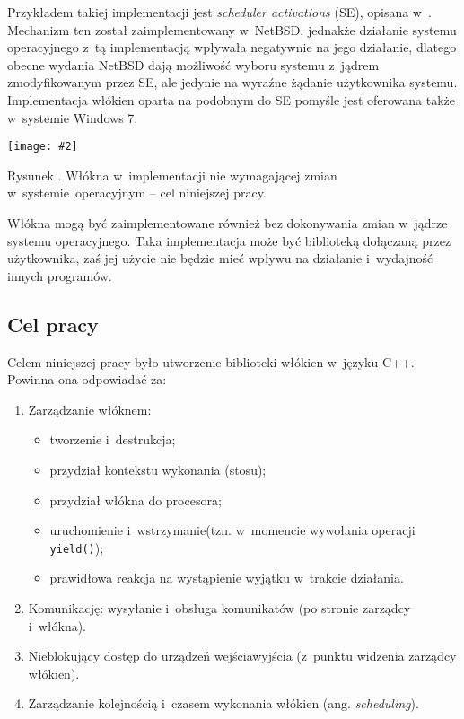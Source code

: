 \documentclass[12pt]{mwart}
\newcommand{\code}{\texttt}
\newcommand{\procbr}{()}
\newcommand{\function}[1]{\code{#1\procbr}}
\newcounter{figmain}
\newcommand{\myownfigure}[4]{ \newcounter{#1} \setcounter{#1}{\value{figmain}} \addtocounter{figmain}{1} \begin{center} \label{fig:#1} \centering \texttt{[image: \#2]}\\ \nopagebreak[5] \parbox[t]{11.5cm}{Rysunek \arabic{#1}. #3.} \end{center}}
\begin{document}
  Przykładem takiej implementacji jest \emph{scheduler activations} (SE), opisana w~\cite{anderson}.
  Mechanizm ten został zaimplementowany w~NetBSD, jednakże działanie systemu operacyjnego z~tą implementacją wpływała negatywnie na jego działanie, 
  dlatego obecne wydania NetBSD dają możliwość wyboru systemu z~jądrem zmodyfikowanym przez SE, ale jedynie na wyraźne żądanie użytkownika systemu.
  Implementacja włókien oparta na podobnym do SE pomyśle jest oferowana także w~systemie Windows 7.
\par
%
\indent
  \myownfigure{mixedintro}{mixedscheme.png}{Włókna w~implementacji nie wymagającej zmian w~systemie~operacyjnym -- cel niniejszej pracy}{.21}
\par
\indent
  Włókna mogą być zaimplementowane również bez dokonywania zmian w~jądrze systemu operacyjnego.
  Taka implementacja może być biblioteką dołączaną przez użytkownika, zaś jej użycie nie będzie mieć wpływu na działanie i~wydajność innych programów.
\par
%
\subsection{Cel pracy}
\label{sec:target}
\indent
  Celem niniejszej pracy było utworzenie biblioteki włókien w~języku C++.
	Powinna ona odpowiadać za:
	\begin{enumerate}
		\item Zarządzanie włóknem:
		\begin{itemize}
			\item tworzenie i~destrukcja;
			\item przydział kontekstu wykonania (stosu);
			\item przydział włókna do procesora;
			\item uruchomienie i~wstrzymanie(tzn. w~momencie wywołania operacji \function{yield});
			\item prawidłowa reakcja na wystąpienie wyjątku w~trakcie działania.
		\end{itemize}
		\item Komunikację: wysyłanie i~obsługa komunikatów (po stronie zarządcy i~włókna).
		\item Nieblokujący dostęp do  urządzeń wejścia\dywiz wyjścia (z~punktu widzenia zarządcy włókien).
    \item Zarządzanie kolejnością i~czasem wykonania włókien (ang. \emph{scheduling}). \label{enm:timesch}
	\end{enumerate}
\par
%
\end{document}
